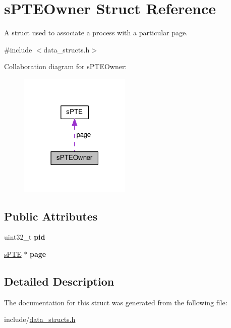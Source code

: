 \hypertarget{structsPTEOwner}{\section{s\-P\-T\-E\-Owner \-Struct \-Reference}
\label{d2/d96/structsPTEOwner}
}


\-A struct used to associate a process with a particular page.  




{\ttfamily \#include $<$data\-\_\-structs.\-h$>$}



\-Collaboration diagram for s\-P\-T\-E\-Owner\-:\nopagebreak
\begin{figure}[H]
\begin{center}
\leavevmode
\includegraphics[width=150pt]{db/d9a/structsPTEOwner__coll__graph}
\end{center}
\end{figure}
\subsection*{\-Public \-Attributes}
\begin{DoxyCompactItemize}
\item 
\hypertarget{structsPTEOwner_a744b2c55b104fba03ec7c1f52f5fc49c}{uint32\-\_\-t {\bfseries pid}}\label{d2/d96/structsPTEOwner_a744b2c55b104fba03ec7c1f52f5fc49c}

\item 
\hypertarget{structsPTEOwner_ac0f7424fdfa9488652bfb14cdbb9eb89}{\hyperlink{structsPTE}{s\-P\-T\-E} $\ast$ {\bfseries page}}\label{d2/d96/structsPTEOwner_ac0f7424fdfa9488652bfb14cdbb9eb89}

\end{DoxyCompactItemize}


\subsection{\-Detailed \-Description}


\-The documentation for this struct was generated from the following file\-:\begin{DoxyCompactItemize}
\item 
include/\hyperlink{data__structs_8h}{data\-\_\-structs.\-h}\end{DoxyCompactItemize}
